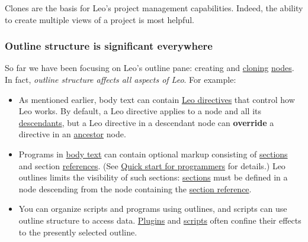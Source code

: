 \documentclass[10pt,a4paper,english]{article}
\begin{document}
Clones are the basis for Leo's project management capabilities. Indeed, the
ability to create multiple views of a project is most helpful.



\hypertarget{outline-structure-is-significant-everywhere}{}
\subsubsection*{Outline structure is significant everywhere}

So far we have been focusing on Leo's outline pane: creating and \href{glossary.html\#clone}{cloning} \href{glossary.html\#nodes}{nodes}.
In fact, \emph{outline structure affects all aspects of Leo}.
For example:
\begin{itemize}
\item {} 
As mentioned earlier, body text can contain \href{\#leo-directives}{Leo directives} that control how Leo works.
By default, a Leo directive applies to a node and all its \href{glossary.html\#descendants}{descendants},
but a Leo directive in a descendant node can \textbf{override} a directive in an \href{glossary.html\#ancestor}{ancestor} node.

\item {} 
Programs in \href{glossary.html\#body-text}{body text} can contain optional markup consisting of \href{glossary.html\#section}{sections} and section \href{glossary.html\#references}{references}.
(See \href{\#quick-start-for-programmers}{Quick start for programmers} for details.)
Leo outlines limits the visibility of such sections:
\href{glossary.html\#section}{sections} must be defined in a node descending from the node containing the \href{glossary.html\#section-reference}{section reference}.

\item {} 
You can organize scripts and programs using outlines, and scripts can use
outline structure to access data. \href{\#plugins-settings}{Plugins} and \href{\#scripting-leo}{scripts} often confine their
effects to the presently selected outline.

\end{itemize}



\hypertarget{leo-directives}{}
\end{document}
